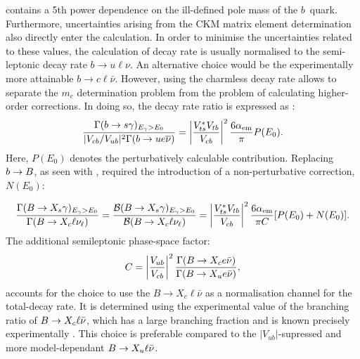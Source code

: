  contains a 5th power dependence on the ill-defined pole mass of the $b$~quark.
Furthermore, uncertainties arising from the CKM matrix element determination also directly enter the calculation.
In order to minimise the uncertainties related to these values, the calculation of \btosgamma decay rate is usually normalised to the semi-leptonic decay rate $b\rightarrow u\ell\nu$.
An alternative choice would be the experimentally more attainable $b\rightarrow c\ell\bar{\nu}$. 
However, using the charmless decay rate allows to separate the $m_c$ determination problem from the problem of calculating higher-order corrections.
In doing so, the decay rate ratio is expressed as \cite{Gambino:2001ew}:
\begin{equation}
    \frac{\Gamma(b\rightarrow s\gamma)_{{E_{\gamma}}>E_0}}{|V_{cb}/V_{ub}|^2 \Gamma(b\rightarrow u e\overline{\nu})} = \left|\frac{V_{ts}^*V_{tb}}{V_{cb}}\right|^2 \frac{6\alpha_{\mathrm{em}}}{\pi}P(E_0).
\end{equation}
Here, $P(E_0)$ denotes the perturbatively calculable contribution. 
Replacing $b\rightarrow B$, as seen with , required the introduction of a non-perturbative correction, $N(E_0)$:

\begin{equation}\label{eq:normalised_br}
    \frac{\Gamma(\BtoXsgamma)_{\Egamma>E_0}}{\Gamma(\B\to X_c\ell\nu_\ell)} = \frac{\mathcal{B}(\BtoXsgamma)_{\Egamma>E_0}}{\mathcal{B}(\B\to X_c\ell\nu_\ell)} = \left|\frac{V_{ts}^*V_{tb}}{V_{cb}}\right|^2\frac{6\alpha_{\mathrm{em}}}{\pi C}[P(E_0)+N(E_0)].
\end{equation}
The additional semileptonic phase-space factor:
\begin{equation}
    C = \left|\frac{V_{ub}}{V_{cb}}\right|^2 \frac{\Gamma(B\rightarrow X_ce\bar{\nu})}{\Gamma(B\rightarrow X_ue\bar{\nu})},
\end{equation}  
accounts for the choice to use the $B\rightarrow X_c\ell\bar{\nu}$ as a normalisation channel for the total-decay rate. 
It is determined using the experimental value of the branching ratio of $B\rightarrow X_c \ell\bar{\nu}$, which has a large branching fraction and is known precisely experimentally \cite{Alberti:2014yda,Workman:2022ynf}.
This choice is preferable compared to the $|V_{ub}|$-supressed and more model-dependant $B\rightarrow X_u\ell\bar{\nu}$.

